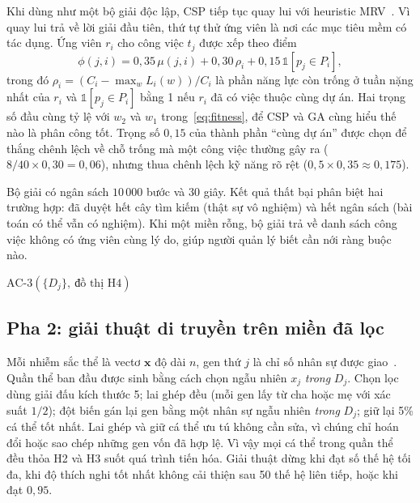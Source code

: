 \documentclass{IEEEtran}
\begin{document}
Khi dùng như một bộ giải độc lập, CSP tiếp tục quay lui với heuristic MRV~\cite{haralick1980}. Vì quay lui trả về lời giải đầu tiên, thứ tự thử ứng viên là nơi các mục tiêu mềm có tác dụng. Ứng viên $r_i$ cho công việc $t_j$ được xếp theo điểm
\begin{equation}
\phi(j,i)=0{,}35\,\mu(j,i)+0{,}30\,\rho_i+0{,}15\,\mathbb{1}[p_j\in P_i],
\label{eq:order}
\end{equation}
trong đó $\rho_i=(C_i-\max_w L_i(w))/C_i$ là phần năng lực còn trống ở tuần nặng nhất của $r_i$ và $\mathbb{1}[p_j\in P_i]$ bằng 1 nếu $r_i$ đã có việc thuộc cùng dự án.
Hai trọng số đầu cùng tỷ lệ với $w_2$ và $w_1$ trong~\eqref{eq:fitness}, để CSP và GA cùng hiểu thế nào là phân công tốt. Trọng số $0{,}15$ của thành phần ``cùng dự án'' được chọn để thắng chênh lệch về chỗ trống mà một công việc thường gây ra ($8/40\times0{,}30=0{,}06$), nhưng thua chênh lệch kỹ năng rõ rệt ($0{,}5\times0{,}35\approx0{,}175$).

Bộ giải có ngân sách $10\,000$ bước và $30$ giây. Kết quả thất bại phân biệt hai trường hợp: đã duyệt hết cây tìm kiếm (thật sự vô nghiệm) và hết ngân sách (bài toán có thể vẫn có nghiệm). Khi một miền rỗng, bộ giải trả về danh sách công việc không có ứng viên cùng lý do, giúp người quản lý biết cần nới ràng buộc nào.

\begin{algorithm}[t]
\caption{Pha thỏa mãn ràng buộc}
\label{alg:csp}
$\text{AC-3}(\{D_j\},\ \text{đồ thị H4})$\;
\;
\end{algorithm}

\subsection{Pha 2: giải thuật di truyền trên miền đã lọc}

Mỗi nhiễm sắc thể là vectơ $\mathbf{x}$ độ dài $n$, gen thứ $j$ là chỉ số nhân sự được giao~\cite{chu1997}. Quần thể ban đầu được sinh bằng cách chọn ngẫu nhiên $x_j$ \emph{trong} $D_j$. Chọn lọc dùng giải đấu kích thước 5; lai ghép đều (mỗi gen lấy từ cha hoặc mẹ với xác suất $1/2$); đột biến gán lại gen bằng một nhân sự ngẫu nhiên \emph{trong} $D_j$; giữ lại 5\% cá thể tốt nhất. Lai ghép và giữ cá thể ưu tú không cần sửa, vì chúng chỉ hoán đổi hoặc sao chép những gen vốn đã hợp lệ. Vì vậy mọi cá thể trong quần thể đều thỏa H2 và H3 suốt quá trình tiến hóa. Giải thuật dừng khi đạt số thế hệ tối đa, khi độ thích nghi tốt nhất không cải thiện sau 50 thế hệ liên tiếp, hoặc khi đạt $0{,}95$.
\end{document}
